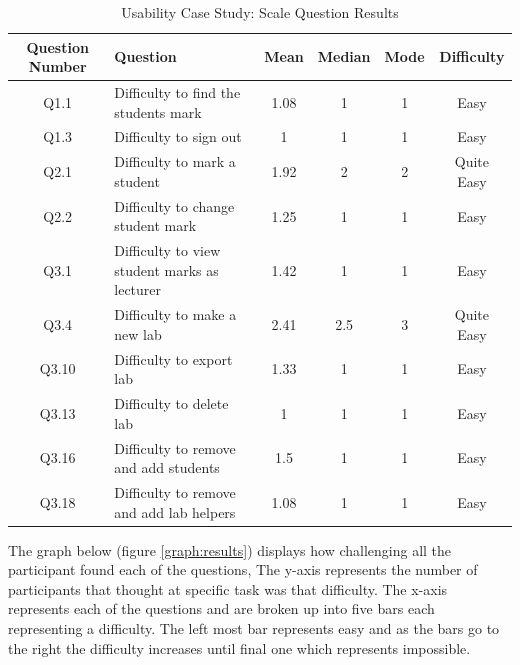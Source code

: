 \documentclass[12pt]{article}  %
\begin{document}
\begin{longtable}{@{\extracolsep{\fill}}|c|l|c|c|c|c|}
\caption{Usability Case Study: Scale Question Results} \label{table:usability} \\ \hline

\textbf{Question Number} & \textbf{Question} & \textbf{Mean} & \textbf{Median} & \textbf{Mode} & \textbf{Difficulty}\\ \hline

Q1.1 & Difficulty to find the students mark & 1.08 & 1 & 1 & Easy\\ \hline
Q1.3 & Difficulty to sign out & 1 & 1 & 1 & Easy \\ \hline

Q2.1 & Difficulty to mark a student & 1.92 & 2 & 2 & Quite Easy \\ \hline
Q2.2 & Difficulty to change student mark & 1.25 & 1 & 1 &  Easy \\ \hline

Q3.1 & Difficulty to view student marks as lecturer & 1.42 & 1 & 1 &  Easy \\ \hline
Q3.4 & Difficulty to make a new lab & 2.41 & 2.5 & 3 & Quite Easy \\ \hline
Q3.10 & Difficulty to export lab & 1.33 & 1 & 1 &  Easy \\ \hline
Q3.13 & Difficulty to delete lab & 1 & 1 & 1 &  Easy \\ \hline
Q3.16 & Difficulty to remove and add students & 1.5 & 1 & 1 &  Easy \\ \hline
Q3.18 & Difficulty to remove and add lab helpers & 1.08 & 1 & 1 & Easy \\ \hline

\end{longtable}

\noindent The graph below (figure \ref{graph:results}) displays how challenging all the participant found each of the questions, The y-axis represents the number of participants that thought at specific task was that difficulty. The x-axis represents each of the questions and are broken up into five bars each representing a difficulty. The left most bar represents easy and as the bars go to the right the difficulty increases until final one which represents impossible.  
\end{document}
